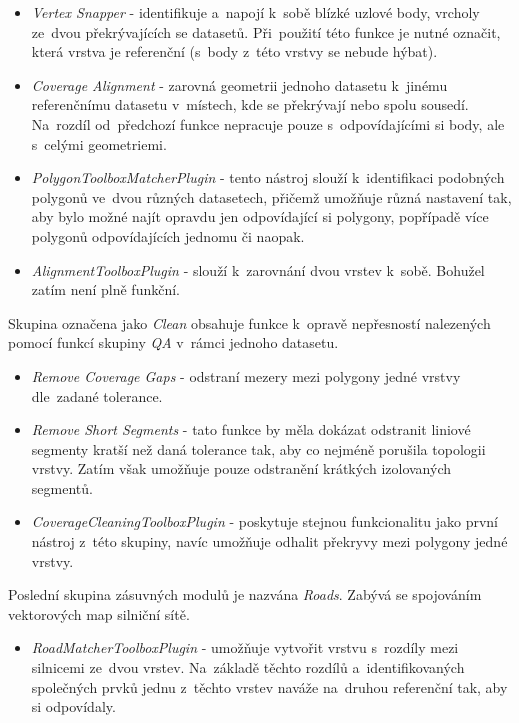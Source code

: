 \begin{itemize}
 \item \textit{Vertex Snapper} - identifikuje a~napojí k~sobě blízké uzlové
    body, vrcholy ze~dvou překrývajících se datasetů. Při~použití této funkce
    je nutné označit, která vrstva je referenční (s~body z~této vrstvy se 
    nebude hýbat).
 \item \textit{Coverage Alignment} - zarovná geometrii jednoho datasetu 
    k~jinému referenčnímu data\-setu v~místech, kde se překrývají nebo spolu
    sousedí. Na~rozdíl od~předchozí funkce ne\-pra\-cuje pouze s~odpovídajícími
    si body, ale s~celými geometriemi.
 \item \textit{PolygonToolboxMatcherPlugin} - tento nástroj slouží k~identifikaci
    podobných polygonů ve~dvou různých datasetech, přičemž umožňuje různá 
    nastavení tak, aby bylo možné najít opravdu jen odpovídající si polygony,
    popřípadě více polygonů odpovídajících jednomu či naopak. 
 \item \textit{AlignmentToolboxPlugin} - slouží k~zarovnání dvou vrstev k~sobě.
    Bohužel zatím není plně funkční.
\end{itemize}

Skupina označena jako \textit{Clean} obsahuje funkce k~opravě nepřesností
nalezených pomocí funkcí skupiny \textit{QA} v~rámci jednoho datasetu.

\begin{itemize}
 \item \textit{Remove Coverage Gaps} - odstraní mezery mezi polygony jedné
    vrstvy dle~zadané tolerance.
 \item \textit{Remove Short Segments} - tato funkce by měla dokázat odstranit
    liniové segmenty kratší než daná tolerance tak, aby co nejméně porušila 
    topologii vrstvy. Zatím však umožňuje pouze odstranění krátkých izolovaných
    segmentů.
 \item \textit{CoverageCleaningToolboxPlugin} - poskytuje stejnou funkcionalitu
    jako první ná\-stroj z~této skupiny, navíc umožňuje odhalit překryvy 
    mezi polygony jedné vrstvy.
\end{itemize}

Poslední skupina zásuvných modulů je nazvána \textit{Roads}. Zabývá se 
spojováním vektorových map silniční sítě.

\begin{itemize}
 \item \textit{RoadMatcherToolboxPlugin} - umožňuje vytvořit vrstvu s~rozdíly
    mezi silnicemi ze~dvou vrstev. Na~základě těchto rozdílů a~identifikovaných
    společných prvků jednu z~těchto vrstev naváže na~druhou referenční tak, 
    aby si odpovídaly.
\end{itemize}


